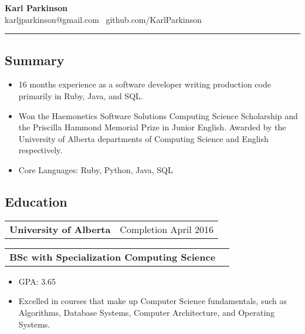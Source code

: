 \documentclass[10pt,letterpaper]{article}
\makeatletter
\newcommand{\headerrow}[2]
{\begin{tabular*}{\linewidth}{l@{\extracolsep{\fill}}r}
	#1 &
	#2 \\
\end{tabular*}}
\makeatother
\begin{document}
\begin{center}
{\LARGE \textbf{Karl Parkinson}}
\\
karljparkinson@gmail.com \textbullet \ github.com/KarlParkinson

\end{center}

\hrule

\subsection*{Summary}
	\begin{itemize}
          \itemsep0em
            \item 16 months experience as a software developer writing production code primarily in Ruby, Java, and SQL.
	    \item Won the Haemonetics Software Solutions Computing Science Scholarship and the Priscilla Hammond Memorial Prize in Junior English. Awarded by the University of Alberta departments of Computing Science and English respectively.
            \item Core Languages: Ruby, Python, Java, SQL
	\end{itemize}
\vspace{-1em}
\subsection*{Education}
	\headerrow
		{\textbf{University of Alberta}}
		{Completion April 2016}
	\headerrow
		{\textbf{BSc with Specialization Computing Science}}
		{}
	\begin{itemize}
          \itemsep0em
          \item GPA: 3.65
          \item Excelled in courses that make up Computer Science fundamentals, such as Algorithms, Database Systems, Computer Architecture, and Operating Systems.
	\end{itemize}
\vspace{-1em}
\end{document}

